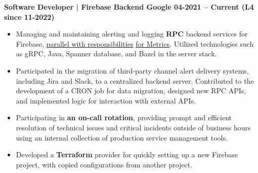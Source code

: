 \textbf{Software Developer | Firebase Backend \hspace{-10mm} \hfill Google \hfill  04-2021 -- Current (L4 since 11-2022)}\par

\begin{itemize}
        \item Managing and maintaining alerting and logging \textbf{RPC} backend services for Firebase, \underline{parallel with responsibilities} \underline{for Metrics}. Utilized technologies such as gRPC, Java, Spanner database, and Bazel in the server stack.
        \item Participated in the migration of third-party channel alert delivery systems, including Jira and Slack, to a centralized backend server. Contributed to the development of a CRON job for data migration, designed new RPC APIs, and implemented logic for interaction with external APIs.
	\item Participating in \textbf{an on-call rotation}, providing prompt and efficient resolution of technical issues and critical incidents outside of business hours using an internal collection of production service management tools.
	\item Developed a \textbf{Terraform} provider for quickly setting up a new Firebase project, with copied configurations from another project.
\end{itemize}\par